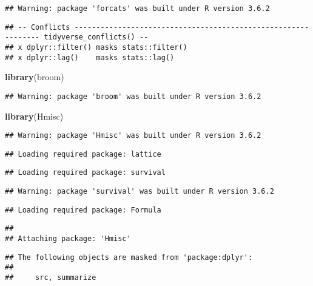 \documentclass[
]{article}
\newenvironment{Shaded}{\begin{snugshade}}{\end{snugshade}}
\newcommand{\KeywordTok}[1]{\textcolor[rgb]{0.13,0.29,0.53}{\textbf{#1}}}
\newcommand{\NormalTok}[1]{#1}
\begin{document}
\begin{verbatim}
## Warning: package 'forcats' was built under R version 3.6.2
\end{verbatim}

\begin{verbatim}
## -- Conflicts -------------------------------------------------------------- tidyverse_conflicts() --
## x dplyr::filter() masks stats::filter()
## x dplyr::lag()    masks stats::lag()
\end{verbatim}

\begin{Shaded}
\begin{Highlighting}[]
\KeywordTok{library}\NormalTok{(broom)}
\end{Highlighting}
\end{Shaded}

\begin{verbatim}
## Warning: package 'broom' was built under R version 3.6.2
\end{verbatim}

\begin{Shaded}
\begin{Highlighting}[]
\KeywordTok{library}\NormalTok{(Hmisc)}
\end{Highlighting}
\end{Shaded}

\begin{verbatim}
## Warning: package 'Hmisc' was built under R version 3.6.2
\end{verbatim}

\begin{verbatim}
## Loading required package: lattice
\end{verbatim}

\begin{verbatim}
## Loading required package: survival
\end{verbatim}

\begin{verbatim}
## Warning: package 'survival' was built under R version 3.6.2
\end{verbatim}

\begin{verbatim}
## Loading required package: Formula
\end{verbatim}

\begin{verbatim}
## 
## Attaching package: 'Hmisc'
\end{verbatim}

\begin{verbatim}
## The following objects are masked from 'package:dplyr':
## 
##     src, summarize
\end{verbatim}
\end{document}
